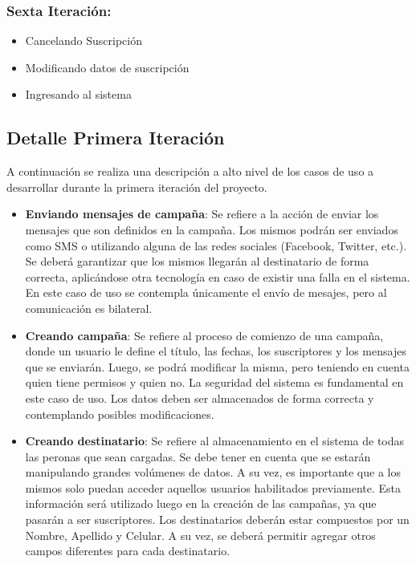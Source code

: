 \documentclass[a4paper, 11pt]{article}
\begin{document}
\subsubsection{Sexta Iteraci\'on:}
\begin{itemize}
\item Cancelando Suscripción
\item Modificando datos de suscripción
\item Ingresando al sistema
\end{itemize}

\subsection{Detalle Primera Iteración}
A continuación se realiza una descripción a alto nivel de los casos de uso a desarrollar durante la primera iteración del proyecto. 
\begin{itemize}
\item \textbf{Enviando mensajes de campaña}: Se refiere a la acción de enviar los mensajes que son definidos en la campaña. Los mismos podrán ser enviados como SMS o utilizando alguna de las redes sociales (Facebook, Twitter, etc.). Se deberá garantizar que los mismos llegarán al destinatario de forma correcta, aplicándose otra tecnología en caso de existir una falla en el sistema. En este caso de uso se contempla únicamente el envío de mesajes, pero al comunicación es bilateral. 
\item \textbf{Creando campaña}: Se refiere al proceso de comienzo de una campaña, donde un usuario le define el título, las fechas, los suscriptores y los mensajes que se enviarán. Luego, se podrá modificar la misma, pero teniendo en cuenta quien tiene permisos y quien no. La seguridad del sistema es fundamental en este caso de uso. Los datos deben ser almacenados de forma correcta y contemplando posibles modificaciones. 
\item \textbf{Creando destinatario}: Se refiere al almacenamiento en el sistema de todas las peronas que sean cargadas. Se debe tener en cuenta que se estarán manipulando grandes volúmenes de datos. A su vez, es importante que a los mismos solo puedan acceder aquellos usuarios habilitados previamente. Esta información será utilizado luego en la creación de las campañas, ya que pasarán a ser suscriptores. Los destinatarios deberán estar compuestos por un Nombre, Apellido y Celular. A su vez, se deberá permitir agregar otros campos diferentes para cada destinatario. 
\end{itemize}
\end{document}
